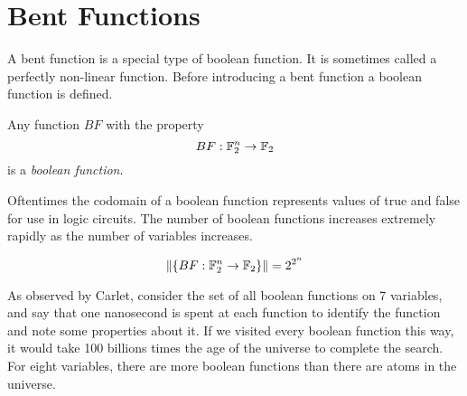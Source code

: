 \section{Bent Functions}
\par A bent function is a special type of boolean function. It is sometimes
called a perfectly non-linear function. Before introducing a bent function
a boolean function is defined.

\begin{definition}
\label{def:boolean-function}
  Any function $BF$ with the property
  \begin{equation}
    BF:\mathbb{F}_2^n\rightarrow\mathbb{F}_2
  \end{equation}
  is a {\em boolean function}.
\end{definition}

\par Oftentimes the codomain of a boolean function represents values of true
and false for use in logic circuits. The number of boolean functions increases
extremely rapidly as the number of variables increases.

\begin{equation}
  \lVert\{BF:\mathbb{F}_2^n\rightarrow\mathbb{F}_2\}\rVert = 2^{2^n}
\end{equation}

\par As observed by Carlet, consider the set of all boolean functions on 7 variables,
and say that one nanosecond is spent at each function to identify the function and
note some properties about it. If we visited every boolean function this way, it
would take 100 billions times the age of the universe to complete the search.
For eight variables, there are more boolean functions than there are atoms in the
universe.

